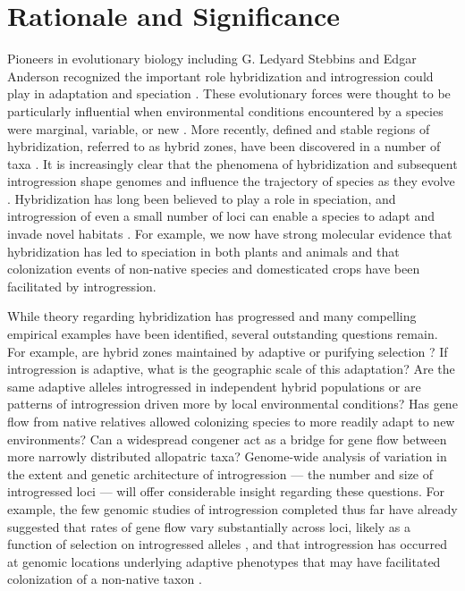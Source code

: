 \section*{Rationale and Significance} 
Pioneers in evolutionary biology including G. Ledyard Stebbins and Edgar Anderson recognized the important role hybridization and introgression could play in adaptation and speciation \citep{Anderson1948, Anderson1954}.
These evolutionary forces were thought to be particularly influential when environmental conditions encountered by a species were marginal, variable, or new \citep{Stebbins1959}.
More recently, defined and stable regions of hybridization, referred to as hybrid zones, have been discovered in a number of taxa \citep[reviewed in ][]{HarrisonHybridZone, shurtliff2013, abbott2014}. 
It is increasingly clear that the phenomena of hybridization and subsequent introgression shape genomes and influence the trajectory of species as they evolve \citep{Ellstrand2014}.
Hybridization has long been believed to play a role in speciation, and introgression of even a small number of loci can enable a species to adapt and invade novel habitats \citep{currat2008, abbott2013}.
For example, we now have strong molecular evidence that hybridization has led to speciation in both plants and animals \citep[reviewed in][]{mallet2007} and that colonization events of non-native species \citep{lucek2010} and domesticated crops \citep{he2011, Hufford2013} have been facilitated by introgression. 

While theory regarding hybridization has progressed and many compelling empirical examples have been identified, several outstanding questions remain. 
For example, are hybrid zones maintained by adaptive or purifying selection \citep{Kruuk1999, Rasmussen2012, Smith2013b}? 
If introgression is adaptive, what is the geographic scale of this adaptation?
Are the same adaptive alleles introgressed in independent hybrid populations or are patterns of introgression driven more by local environmental conditions?
Has gene flow from native relatives allowed colonizing species to more readily adapt to new environments?
Can a widespread congener act as a bridge for gene flow between more narrowly distributed allopatric taxa? 
Genome-wide analysis of variation in the extent and genetic architecture of introgression --- the number and size of introgressed loci ---  will offer considerable insight regarding these questions.  
For example, the few genomic studies of introgression completed thus far have already suggested that rates of gene flow vary substantially across loci, likely as a function of selection on introgressed alleles \citep{Hufford2013, Poelstra2014}, and that introgression has occurred at genomic locations underlying adaptive phenotypes that may have facilitated colonization of a non-native taxon \citep{Hufford2013}.
 


